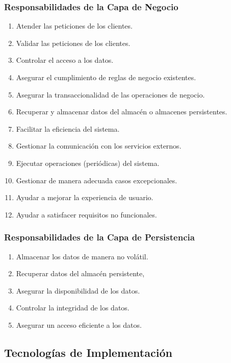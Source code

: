 \documentclass[a4paper,slidestop,xcolor=pst,dvips,blue]{beamer}
\begin{document}
\begin{frame}[c]
	\frametitle{Responsabilidades de la Capa de Negocio}
	\begin{enumerate}[<+->]
        \item Atender las peticiones de los clientes.
        \item Validar las peticiones de los clientes.
        \item Controlar el acceso a los datos.
        \item Asegurar el cumplimiento de \alert{reglas de negocio} existentes.
        \item Asegurar la \alert{transaccionalidad} de las operaciones de negocio.
        \item Recuperar y almacenar datos del almacén o almacenes persistentes.
        \item Facilitar la eficiencia del sistema.
        \item Gestionar la comunicación con los servicios externos.
        \item Ejecutar operaciones (periódicas) del sistema.
        \item Gestionar de manera adecuada casos excepcionales.
        \item Ayudar a mejorar la experiencia de usuario.
        \item Ayudar a satisfacer requisitos no funcionales.
	\end{enumerate}
\end{frame}

\begin{frame}[c]
	\frametitle{Responsabilidades de la Capa de Persistencia}
	\begin{enumerate}[<+->]
        \item Almacenar los datos de manera no volátil.
        \item Recuperar datos del almacén persistente,
        \item Asegurar la disponibilidad de los datos.
        \item Controlar la integridad de los datos.
        \item Asegurar un acceso eficiente a los datos.
	\end{enumerate}
\end{frame}

\subsection{Tecnologías de Implementación}
\end{document}

